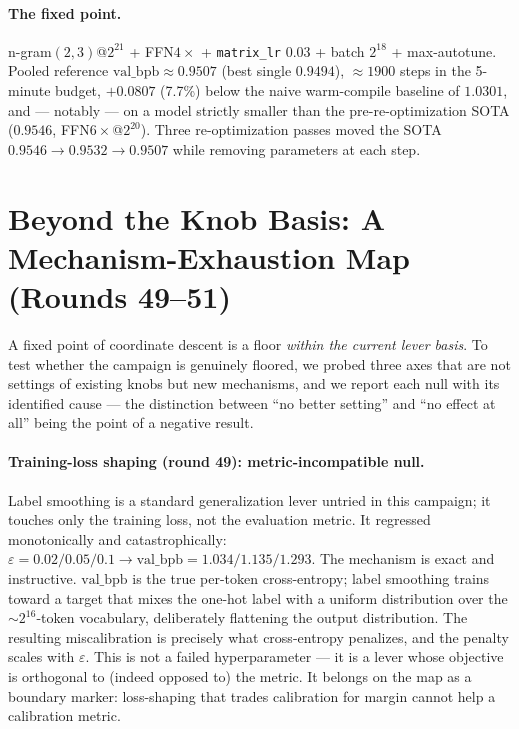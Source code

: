 \documentclass{article}
\newcommand{\valbpb}{\mathrm{val\_bpb}}
\begin{document}
\paragraph{The fixed point.} n-gram$(2,3)$@$2^{21}$ + FFN$4\times$ + \texttt{matrix\_lr} $0.03$ + batch $2^{18}$ + max-autotune. Pooled reference $\valbpb \approx 0.9507$ (best single $0.9494$), $\approx 1900$ steps in the 5-minute budget, $+0.0807$ (7.7\%) below the naive warm-compile baseline of $1.0301$, and --- notably --- on a model strictly smaller than the pre-re-optimization SOTA ($0.9546$, FFN$6\times$@$2^{20}$). Three re-optimization passes moved the SOTA $0.9546 \rightarrow 0.9532 \rightarrow 0.9507$ while removing parameters at each step.

\section{Beyond the Knob Basis: A Mechanism-Exhaustion Map (Rounds 49--51)}
\label{sec:exhaustion}

A fixed point of coordinate descent is a floor \emph{within the current lever basis}. To test whether the campaign is genuinely floored, we probed three axes that are not settings of existing knobs but new mechanisms, and we report each null with its identified cause --- the distinction between ``no better setting'' and ``no effect at all'' being the point of a negative result.

\paragraph{Training-loss shaping (round 49): metric-incompatible null.} Label smoothing is a standard generalization lever untried in this campaign; it touches only the training loss, not the evaluation metric. It regressed monotonically and catastrophically: $\varepsilon = 0.02/0.05/0.1 \rightarrow \valbpb = 1.034/1.135/1.293$. The mechanism is exact and instructive. $\valbpb$ is the true per-token cross-entropy; label smoothing trains toward a target that mixes the one-hot label with a uniform distribution over the $\sim$$2^{16}$-token vocabulary, deliberately flattening the output distribution. The resulting miscalibration is precisely what cross-entropy penalizes, and the penalty scales with $\varepsilon$. This is not a failed hyperparameter --- it is a lever whose objective is orthogonal to (indeed opposed to) the metric. It belongs on the map as a boundary marker: loss-shaping that trades calibration for margin cannot help a calibration metric.
\end{document}
